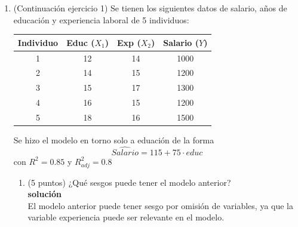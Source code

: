 \documentclass[10pt,a4paper]{article}
\begin{document}
\begin{enumerate}
\begin{enumerate}
\[(X^\top X)^{-1} =
\begin{bmatrix}
8,5 & 0,19 & -0,11 \\
0,19 & 0,5 & -0,02 \\
-0,11 & -0,02 & 0,04 \\
\end{bmatrix}
\]

$$ \sum_{i=1}^{n} (y_i - \bar{y})^2=6.800$$
Determine la varianza de los estimadores de la regresión MCO.

{\color{blue} 
Sabemos que $SSR/SST = 0,727$ y $SST=6800$, por lo tanto, $SSR = 0,727\cdot 6800=4943,6 $, entonces:
$$\hat{\sigma}^2 = \frac{\sum_{i=1}^{n} \hat{u}_i^2 }{n-k-1}= \frac{SSR}{n - k - 1}=\frac{4943,6}{4137-2-1}=1,1958$$
    
    \[
\text{Var}(\hat{\beta}|X) = \hat{\sigma}^2(X^{\top}X)^{-1}
\]

Solo necesitamos la varianza de los estimadores así que  os quedamos con los elementos de la diagonal de la matriz de var-covar.

$$\text{Var}(\hat{\beta_0}|X)=10,1643\quad 
\text{Var}(\hat{\beta_1}|X)=0,5979
\quad \text{Var}(\hat{\beta_2}|X)=0,0478$$}
\end{enumerate}


\item (Continuación ejercicio 1) Se tienen los siguientes datos de salario, años de educación y experiencia laboral de 5 individuos:
\begin{center}
\begin{tabular}{|c|c|c|c|}
\hline
\textbf{Individuo} & \textbf{Educ} ($X_1$) & \textbf{Exp} ($X_2$)  & \textbf{Salario ($Y$)}\\
\hline
1 & 12 & 14 & 1000 \\
2 & 14 & 15 & 1200 \\
3 & 15 & 17 & 1300 \\
4 & 16 & 15 & 1200 \\
5 & 18 & 16 & 1500 \\
\hline
\end{tabular}
\end{center}

Se hizo el modelo en torno solo a eduación de la forma
$$\hat{Salario}= 115 + 75\cdot educ$$
con $R^2 = 0.85$ y $R^2_{adj} = 0.8$
\begin{enumerate}

    \item (5 puntos) ¿Qué sesgos puede tener el modelo anterior?
    \\
    \textbf{solución}
    \\
    El modelo anterior puede tener sesgo por omisión de variables, ya que la variable experiencia puede ser relevante en el modelo.
    \\


\end{enumerate}
\end{enumerate}
\end{document}
